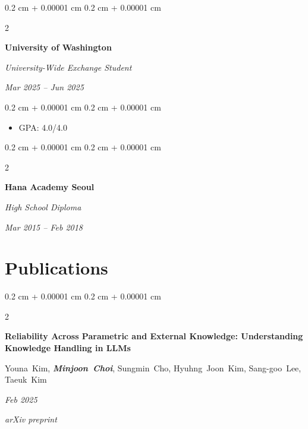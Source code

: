 \documentclass[10pt, letterpaper]{article}
\newenvironment{highlights}{
    \begin{itemize}[
        topsep=0.10 cm,
        parsep=0.10 cm,
        partopsep=0pt,
        itemsep=0pt,
        leftmargin=0.4 cm + 10pt
    ]
}{
    \end{itemize}
} %
\newenvironment{onecolentry}{
    \begin{adjustwidth}{
        0.2 cm + 0.00001 cm
    }{
        0.2 cm + 0.00001 cm
    }
}{
    \end{adjustwidth}
} %
\newenvironment{twocolentry}[2][]{
    \onecolentry
    \def\secondColumn{#2}
    \setcolumnwidth{\fill, 4.5 cm}
    \begin{paracol}{2}
}{
    \switchcolumn \raggedleft \secondColumn
    \end{paracol}
    \endonecolentry
} %
\let\hrefWithoutArrow\href
\renewcommand{\href}[2]{\hrefWithoutArrow{#1}{\ifthenelse{\equal{#2}{}}{ }{#2 }\raisebox{.15ex}{\footnotesize \faExternalLink*}}}
\begin{document}
        \vspace{0.3 cm}

        \begin{twocolentry}{
            \textit{Mar 2025 – Jun 2025}}
            \textbf{University of Washington}

            \textit{University-Wide Exchange Student}
        \end{twocolentry}

        \vspace{0.10 cm}
        \begin{onecolentry}
            \begin{highlights}
                \item GPA: 4.0/4.0
            \end{highlights}
        \end{onecolentry}

        \vspace{0.3 cm}

        \begin{twocolentry}{
            \textit{Mar 2015 – Feb 2018}}
            \textbf{Hana Academy Seoul}

            \textit{High School Diploma}
        \end{twocolentry}


    \section{Publications}

        \begin{samepage}
            \begin{twocolentry}{
            \textit{Feb 2025}    
                
            \textit{arXiv preprint}}
                \textbf{Reliability Across Parametric and External Knowledge: Understanding Knowledge Handling in LLMs}

                \vspace{0.10 cm}

                \mbox{Youna Kim}, \mbox{\textbf{\textit{Minjoon Choi}}}, \mbox{Sungmin Cho}, \mbox{Hyuhng Joon Kim}, \mbox{Sang-goo Lee}, \mbox{Taeuk Kim}
            \end{twocolentry}


        \end{samepage}
\end{document}
